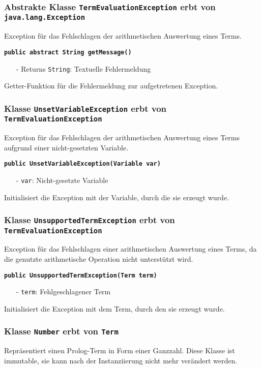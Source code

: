 \documentclass[parskip=full,11pt,twoside]{scrartcl}
\begin{document}
\subsubsection{Abstrakte Klasse \texttt{TermEvaluationException} erbt von\\\texttt{java.lang.Exception}}
Exception für das Fehlschlagen der arithmetischen Auswertung eines Terms.

\textbf{\texttt{public abstract String getMessage()}}
\begin{itemize}[noitemsep]
	\item[-] Returns \texttt{String}: Textuelle Fehlermeldung
\end{itemize}
Getter-Funktion für die Fehlermeldung zur aufgetretenen Exception.

\subsubsection{Klasse \texttt{UnsetVariableException} erbt von\\\texttt{TermEvaluationException}}
Exception für das Fehlschlagen der arithmetischen Auswertung eines Terms aufgrund einer nicht-gesetzten Variable.

\textbf{\texttt{public UnsetVariableException(Variable var)}}
\begin{itemize}[noitemsep]
	\item[-] \texttt{var}: Nicht-gesetzte Variable
\end{itemize}
Initialisiert die Exception mit der Variable, durch die sie erzeugt wurde.

\subsubsection{Klasse \texttt{UnsupportedTermException} erbt von\\\texttt{TermEvaluationException}}
Exception für das Fehlschlagen einer arithmetischen Auswertung eines Terms, da die genutzte arithmetische Operation nicht unterstützt wird.

\textbf{\texttt{public UnsupportedTermException(Term term)}}
\begin{itemize}[noitemsep]
	\item[-] \texttt{term}: Fehlgeschlagener Term
\end{itemize}
Initialisiert die Exception mit dem Term, durch den sie erzeugt wurde.

\subsubsection{Klasse \texttt{Number} erbt von \texttt{Term}}
Repräsentiert einen Prolog-Term in Form einer Ganzzahl. Diese Klasse ist immutable, sie kann nach der Instanziierung nicht mehr verändert werden.
\end{document}
